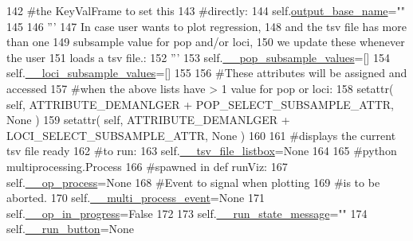 \begin{DoxyCode}
142         \textcolor{comment}{#the KeyValFrame to set this}
143         \textcolor{comment}{#directly:}
144         self.\hyperlink{classnegui_1_1pgguiviz_1_1PGGuiViz_a38bbcd1793a59cee540c1168db30bc6b}{output\_base\_name}=\textcolor{stringliteral}{""}
145 
146         \textcolor{stringliteral}{'''}
147 \textcolor{stringliteral}{        In case user wants to plot regression,}
148 \textcolor{stringliteral}{        and the tsv file has more than one}
149 \textcolor{stringliteral}{        subsample value for pop and/or loci,}
150 \textcolor{stringliteral}{        we update these whenever the user}
151 \textcolor{stringliteral}{        loads a tsv file.:}
152 \textcolor{stringliteral}{        '''}
153         self.\hyperlink{classnegui_1_1pgguiviz_1_1PGGuiViz_aceea1ac2e59eb80acc29c20b8c4fb664}{\_\_pop\_subsample\_values}=[]
154         self.\hyperlink{classnegui_1_1pgguiviz_1_1PGGuiViz_a7f64d2dce87732e2016f75a1ec8fd67f}{\_\_loci\_subsample\_values}=[]
155     
156         \textcolor{comment}{#These attributes will be assigned and accessed}
157         \textcolor{comment}{#when the above lists have > 1 value for pop or loci:}
158         setattr( self, ATTRIBUTE\_DEMANLGER + POP\_SELECT\_SUBSAMPLE\_ATTR, \textcolor{keywordtype}{None} )
159         setattr( self, ATTRIBUTE\_DEMANLGER + LOCI\_SELECT\_SUBSAMPLE\_ATTR, \textcolor{keywordtype}{None} )
160 
161         \textcolor{comment}{#displays the current tsv file ready}
162         \textcolor{comment}{#to run:}
163         self.\hyperlink{classnegui_1_1pgguiviz_1_1PGGuiViz_afb8063440deb9311663ac71f4507ae9e}{\_\_tsv\_file\_listbox}=\textcolor{keywordtype}{None}
164 
165         \textcolor{comment}{#python multiprocessing.Process}
166         \textcolor{comment}{#spawned in def runViz:}
167         self.\hyperlink{classnegui_1_1pgguiviz_1_1PGGuiViz_a428e0ea6bca944c0de1e8d8c571ec81d}{\_\_op\_process}=\textcolor{keywordtype}{None}
168         \textcolor{comment}{#Event to signal when plotting}
169         \textcolor{comment}{#is to be aborted.}
170         self.\hyperlink{classnegui_1_1pgguiviz_1_1PGGuiViz_a5cc8ffaa40aef496ac5d9c4c1eeaeac7}{\_\_multi\_process\_event}=\textcolor{keywordtype}{None}
171         self.\hyperlink{classnegui_1_1pgguiviz_1_1PGGuiViz_a96f781375874265f5b89f264ef10c7d3}{\_\_op\_in\_progress}=\textcolor{keyword}{False}
172 
173         self.\hyperlink{classnegui_1_1pgguiviz_1_1PGGuiViz_aaf229b337d43c2005b89d47949cb72d7}{\_\_run\_state\_message}=\textcolor{stringliteral}{""}
174         self.\hyperlink{classnegui_1_1pgguiviz_1_1PGGuiViz_ab848f92fe2c64f16a3539a473bb2ce7f}{\_\_run\_button}=\textcolor{keywordtype}{None}

\end{DoxyCode}
